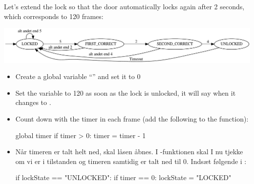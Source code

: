 \begin{exercisebox}[adjusted title= Automatic relock after 2 seconds]

Let's extend the lock so that the door automatically locks again after 2 seconds,
which corresponds to 120 frames:

\noindent
\begin{center}
\includegraphics[width=1.0\textwidth]{graphviz/combinationLock_timeout}
\end{center}

\begin{itemize}
\item Create a global variable ``'' and set it to 0
\item Set the  variable to 120 as soon as the lock is unlocked, it will
 say when it changes  to .
\item Count down with the timer in each frame (add the following to the  function):


\begin{python}
global timer
if timer > 0:
   timer = timer - 1
\end{python}
\item Når timeren er talt helt ned, skal låsen åbnes. I
 -funktionen skal I nu tjekke om vi er i tilstanden
  og timeren samtidig er talt ned til 0. Indsæt
 følgende i :
 
\begin{python}
if lockState == "UNLOCKED":
   if timer == 0:
       lockState = "LOCKED"
\end{python}

\end{itemize}
\end{exercisebox}
